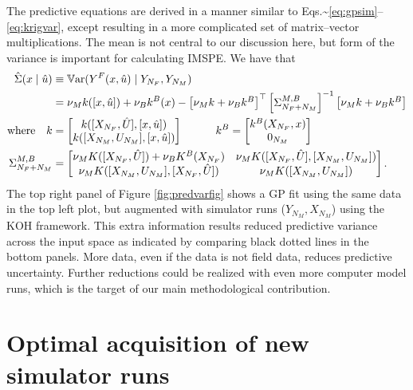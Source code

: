 \documentclass[
]{article}
\begin{document}
The predictive equations are derived in a manner similar to Eqs.\textasciitilde\eqref{eq:gpsim}--\eqref{eq:krigvar}, except resulting in a more complicated set of matrix--vector multiplications. The mean is not central to our discussion here,
but form of the variance is important for calculating IMSPE. We have that
\begin{align}
\hat{\Sigma}(x \mid \hat{u}) &\equiv 
\mathbb{V}\mathrm{ar} ( Y^F(x,\hat{u}) \mid Y_{N_F}, Y_{N_M}) 
\label{eq:krigvarfield} \\
&= \nu_M k([x, \hat{u}])  + \nu_B k^B{(x)} - \begin{bmatrix}
\nu_M k + \nu_B k^B
\end{bmatrix}^\top \begin{bmatrix}
 \Sigma^{M,B}_{N_F + N_M}
\end{bmatrix}^{-1}
\begin{bmatrix}
\nu_M k + \nu_B k^B
\end{bmatrix} \notag \\
\mbox{where} \quad k &= \begin{bmatrix}
k{([X_{N_F}, \hat{U}], [x, \hat{u}])} \\
k([X_{N_M}, U_{N_M}],[x, \hat{u}])
\end{bmatrix} \quad\quad\quad 
k^B = \begin{bmatrix}
k^B{(X_{N_F}, x)} \\
0_{N_M}
\end{bmatrix} \notag \\
\Sigma^{M,B}_{N_F + N_M} &=  \begin{bmatrix}
\nu_M K([X_{N_F}, \hat{U}]) + \nu_B K^B(X_{N_F}) & \nu_M K([X_{N_F}, \hat{U}],[X_{N_M}, U_{N_M}])\\
\nu_M K([X_{N_M}, U_{N_M}],[X_{N_F}, \hat{U}]) & \nu_M K([X_{N_M}, U_{N_M}])
\end{bmatrix}. \notag
\end{align}
The top right panel of Figure \ref{fig:predvarfig} shows a GP fit using the
same data in the top left plot, but augmented with simulator runs (\(Y_{N_M}, X_{N_M}\)) using the KOH framework. This extra information results reduced
predictive variance across the input space as indicated by comparing black
dotted lines in the bottom panels. More data, even if the data is not field
data, reduces predictive uncertainty. Further reductions could be realized
with even more computer model runs, which is the target of our main
methodological contribution.

\hypertarget{kohimspesec}{%
\section{Optimal acquisition of new simulator runs}\label{kohimspesec}}
\end{document}
